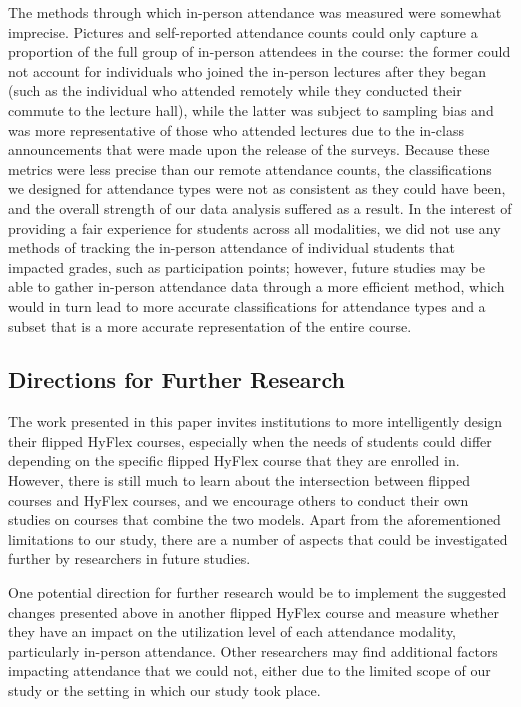 The methods through which in-person attendance was measured were somewhat imprecise. Pictures and self-reported attendance counts could only capture a proportion of the full group of in-person attendees in the course: the former could not account for individuals who joined the in-person lectures after they began (such as the individual who attended remotely while they conducted their commute to the lecture hall), while the latter was subject to sampling bias and was more representative of those who attended lectures due to the in-class announcements that were made upon the release of the surveys. Because these metrics were less precise than our remote attendance counts, the classifications we designed for attendance types were not as consistent as they could have been, and the overall strength of our data analysis suffered as a result. In the interest of providing a fair experience for students across all modalities, we did not use any methods of tracking the in-person attendance of individual students that impacted grades, such as participation points; however, future studies may be able to gather in-person attendance data through a more efficient method, which would in turn lead to more accurate classifications for attendance types and a subset that is a more accurate representation of the entire course.

\subsection{Directions for Further Research}

The work presented in this paper invites institutions to more intelligently design their flipped HyFlex courses, especially when the needs of students could differ depending on the specific flipped HyFlex course that they are enrolled in. However, there is still much to learn about the intersection between flipped courses and HyFlex courses, and we encourage others to conduct their own studies on courses that combine the two models. Apart from the aforementioned limitations to our study, there are a number of aspects that could be investigated further by researchers in future studies.

One potential direction for further research would be to implement the suggested changes presented above in another flipped HyFlex course and measure whether they have an impact on the utilization level of each attendance modality, particularly in-person attendance. Other researchers may find additional factors impacting attendance that we could not, either due to the limited scope of our study or the setting in which our study took place.

